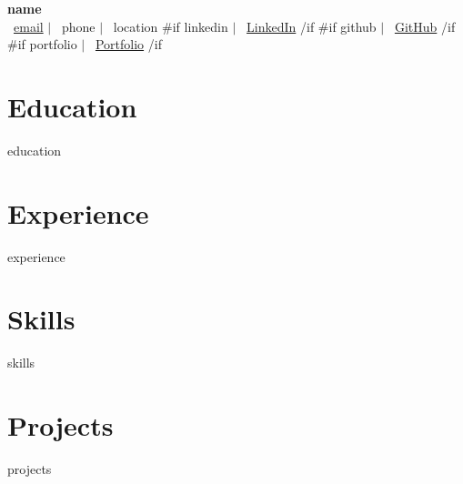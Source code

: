 \documentclass[11pt,a4paper]{article}
\begin{document}
\begin{center}
    {\Huge\textbf{{{name}}}}\\[0.5em]
    \faEnvelope\ \href{mailto:{{email}}}{{{email}}} $|$
    \faPhone\ {{phone}} $|$
    \faMapMarker*\ {{location}}
    {{#if linkedin}}
    $|$ \faLinkedin\ \href{{{linkedin}}}{LinkedIn}
    {{/if}}
    {{#if github}}
    $|$ \faGithub\ \href{{{github}}}{GitHub}
    {{/if}}
    {{#if portfolio}}
    $|$ \faGlobe\ \href{{{portfolio}}}{Portfolio}
    {{/if}}
\end{center}

\section{Education}
{{education}}

\section{Experience}
{{experience}}

\section{Skills}
{{skills}}

\section{Projects}
{{projects}}
\end{document}
